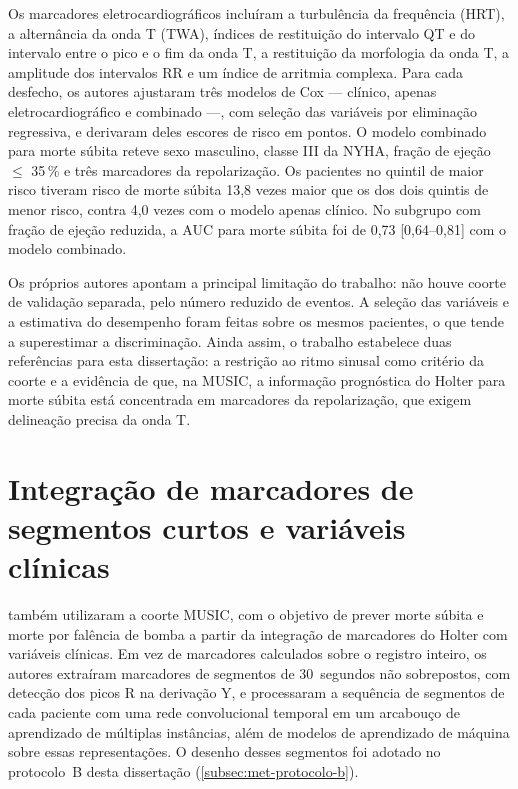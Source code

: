 Os marcadores eletrocardiográficos incluíram a turbulência da frequência (HRT), a alternância da onda T (TWA), índices de restituição do intervalo QT e do intervalo
entre o pico e o fim da onda T, a restituição da morfologia da onda T, a
amplitude dos intervalos RR e um índice de arritmia complexa. Para cada
desfecho, os autores ajustaram três modelos de Cox --- clínico, apenas
eletrocardiográfico e combinado ---, com seleção das variáveis por
eliminação regressiva, e derivaram deles escores de risco em pontos. O
modelo combinado para morte súbita reteve sexo masculino, classe III da
\gls{NYHA}, fração de ejeção $\leq$ 35\,\% e três marcadores da repolarização.
Os pacientes no quintil de maior risco tiveram risco de morte súbita 13,8
vezes maior que os dos dois quintis de menor risco, contra 4,0 vezes com o
modelo apenas clínico. No subgrupo com fração de ejeção reduzida, a
\gls{AUC} para morte súbita foi de 0,73 [0,64--0,81] com o modelo
combinado.

Os próprios autores apontam a principal limitação do trabalho: não houve
coorte de validação separada, pelo número reduzido de eventos. A seleção
das variáveis e a estimativa do desempenho foram feitas sobre os mesmos
pacientes, o que tende a superestimar a discriminação. Ainda assim, o
trabalho estabelece duas referências para esta dissertação: a restrição ao
ritmo sinusal como critério da coorte e a evidência de que, na MUSIC, a
informação prognóstica do Holter para morte súbita está concentrada em
marcadores da repolarização, que exigem delineação precisa da onda T.

\section{Integração de marcadores de segmentos curtos e variáveis clínicas}
\label{sec:trab-swee}

 também utilizaram a coorte MUSIC, com o
objetivo de prever morte súbita e morte por falência de bomba a partir da
integração de marcadores do Holter com variáveis clínicas. Em vez de
marcadores calculados sobre o registro inteiro, os autores extraíram
marcadores de segmentos de 30~segundos não sobrepostos, com detecção dos
picos R na derivação Y, e processaram a sequência de segmentos de cada
paciente com uma rede convolucional temporal em um arcabouço de aprendizado
de múltiplas instâncias, além de modelos de aprendizado de máquina sobre
essas representações. O desenho desses segmentos foi adotado no
protocolo~B desta dissertação (\autoref{subsec:met-protocolo-b}).

